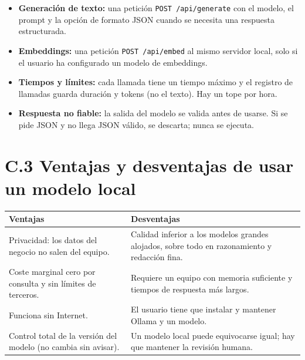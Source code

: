 \begin{itemize}
\tightlist
\item
  \textbf{Generación de texto:} una petición \texttt{POST\ /api/generate} con el modelo, el prompt y la opción de formato JSON cuando se necesita una respuesta estructurada.
\item
  \textbf{Embeddings:} una petición \texttt{POST\ /api/embed} al mismo servidor local, solo si el usuario ha configurado un modelo de embeddings.
\item
  \textbf{Tiempos y límites:} cada llamada tiene un tiempo máximo y el registro de llamadas guarda duración y tokens (no el texto). Hay un tope por hora.
\item
  \textbf{Respuesta no fiable:} la salida del modelo se valida antes de usarse. Si se pide JSON y no llega JSON válido, se descarta; nunca se ejecuta.
\end{itemize}

\section{C.3 Ventajas y desventajas de usar un modelo local}\label{c.3-ventajas-y-desventajas-de-usar-un-modelo-local}

{\def\LTcaptype{none} %
\begin{longtable}[]{@{}
  >{\raggedright\arraybackslash}p{}
  >{\raggedright\arraybackslash}p{}@{}}
\toprule\noalign{}
\begin{minipage}[b]{\linewidth}\raggedright
Ventajas
\end{minipage} & \begin{minipage}[b]{\linewidth}\raggedright
Desventajas
\end{minipage} \\
\midrule\noalign{}
\endhead
\bottomrule\noalign{}
\endlastfoot
Privacidad: los datos del negocio no salen del equipo. & Calidad inferior a los modelos grandes alojados, sobre todo en razonamiento y redacción fina. \\
Coste marginal cero por consulta y sin límites de terceros. & Requiere un equipo con memoria suficiente y tiempos de respuesta más largos. \\
Funciona sin Internet. & El usuario tiene que instalar y mantener Ollama y un modelo. \\
Control total de la versión del modelo (no cambia sin avisar). & Un modelo local puede equivocarse igual; hay que mantener la revisión humana. \\
\end{longtable}
}

